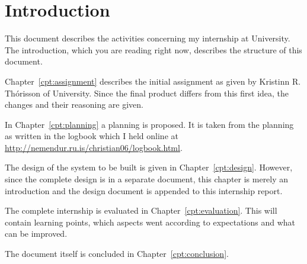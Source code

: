 \chapter{\label{cpt:introduction}Introduction}

This document describes the activities concerning my internship at \Rvk{}
University. The introduction, which you are reading right now, describes the
structure of this document.

Chapter~\ref{cpt:assignment} describes the initial assignment as given by
Kristinn R.  Th\'orisson of \Rvk{} University. Since the final product differs
from this first idea, the changes and their reasoning are given.

In Chapter~\ref{cpt:planning} a planning is proposed. It is taken from the
planning as written in the logbook which I held online at
\url{http://nemendur.ru.is/christian06/logbook.html}.

The design of the system to be built is given in Chapter~\ref{cpt:design}.
However, since the complete design is in a separate document, this chapter is
merely an introduction and the design document is appended to this internship
report.

The complete internship is evaluated in Chapter~\ref{cpt:evaluation}. This will
contain learning points, which aspects went according to expectations and what
can be improved.

The document itself is concluded in Chapter~\ref{cpt:conclusion}.

